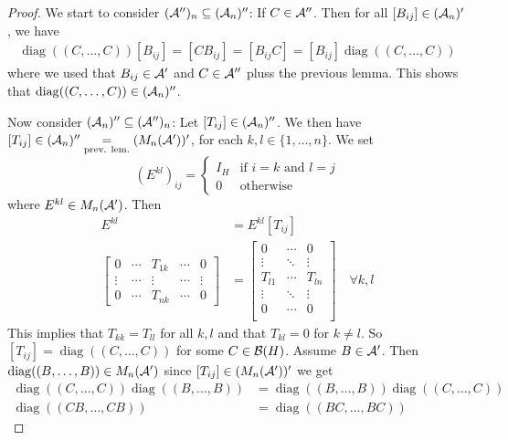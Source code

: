 \documentclass[10pt,english,a4paper]{article}
\theoremstyle{definition}
\DeclareMathOperator{\diag}{diag}
\begin{document}
\begin{proof}
We start to consider $(\mathcal{A}'')_n\subseteq (\mathcal{A}_n)''$: If $C \in \mathcal{A}''$. Then for all 
$[B_{ij}] \in (\mathcal{A}_n)'$, we have 
\begin{align*}
    \diag((C,\ldots, C))[B_{ij}] = [CB_{ij}] = [B_{ij}C] = [B_{ij}]\diag((C,\ldots,C))
\end{align*}
where we used that $B_{ij}\in \mathcal{A}'$ and $C\in \mathcal{A}''$ pluss the previous lemma.
This shows that 
$\diag((C,\ldots, C)) \in (\As_n)''$.

Now consider $(\mathcal{A}_n)'' \subseteq (\mathcal{A}'')_n$:
Let $[T_{ij}] \in (\mathcal{A}_n)''$. We then have 
$[T_{ij}] \in (\mathcal{A}_n)'' \underset{\text{prev. lem.}}{=} (M_n(\mathcal{A}'))'$, for 
each $k,l \in \{1,\ldots,n\}$. 
We set 
\[(E^{kl})_{ij} = \begin{cases} 
I_H &  \text{if } i =k \text{ and } l=j \\
 0 &\text{otherwise} \end{cases}\] 
where $E^{kl} \in M_{n}(\mathcal{A}')$. Then 
\begin{align*}
    [T_{ij}]E^{kl} &= E^{kl}[T_{ij}] \\
    \begin{bmatrix} 
       0 &\cdots & T_{1k} &\cdots & 0 \\
       \vdots &\cdots & \vdots &\cdots &\vdots \\
       0 &\cdots & T_{nk} & \cdots & 0
    \end{bmatrix}
&=
    \begin{bmatrix} 
       0   &\cdots & 0 \\
       \vdots &\ddots &\vdots \\
       T_{l1} &  \cdots & T_{ln} \\
       \vdots  &\ddots &\vdots \\
       0   &\cdots & 0 \\
    \end{bmatrix}
\quad\forall k,l
\end{align*}
This implies that $T_{kk} = T_{ll}$ for all $k,l$
and that $T_{kl} = 0$ for $k\neq l$.
So $[T_{ij}] = \diag((C,\ldots,C))$
for some $C \in \mathcal{B}(H)$. Assume $B \in \mathcal{A}'$. Then $\diag((B,\ldots,B))\in M_n(\As')$
since $[T_{ij}] \in (M_n(\mathcal{A}'))'$ we get 
\begin{align*}
    \diag((C,\ldots, C))\diag((B,\ldots, B))
&= \diag((B,\ldots, B))\diag((C,\ldots, C))  \\
\diag((CB,\ldots, CB)) &= \diag((BC,\ldots, BC)) 
\end{align*}
\end{proof}
\end{document}
